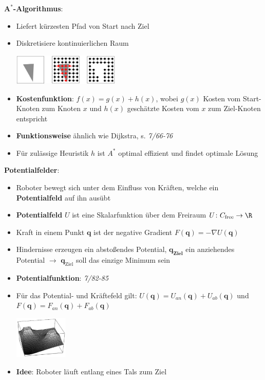 \bigskip
\textbf{$\mathbf{A^*}$-Algorithmus}:
\begin{itemize}
	\item Liefert kürzesten Pfad von Start nach Ziel
	\item Diskretisiere kontinuierlichen Raum
	\begin{center}
		\includegraphics[width=0.4\textwidth]{images/a-s.png}
	\end{center}
	\item \textbf{Kostenfunktion}: $f(x)=g(x)+h(x)$, wobei $g(x)$ Kosten vom Start-Knoten zum Knoten $x$ und $h(x)$ geschätzte Kosten vom $x$ zum Ziel-Knoten entspricht
	\item \textbf{Funktionsweise} ähnlich wie Dijkstra, s. \textit{7/66-76}
	\item Für zulässige Heuristik $h$ ist $A^*$ optimal effizient und findet optimale Lösung
\end{itemize}
\bigskip
\textbf{Potentialfelder}:
\begin{itemize}
	\item Roboter bewegt sich unter dem Einfluss von Kräften, welche ein \textbf{Potentialfeld} auf ihn ausübt
	\item \textbf{Potentialfeld} $U$ ist eine Skalarfunktion über dem Freiraum $U\colon C_\text{free}\rightarrow \R$
	\item Kraft in einem Punkt $\mathbf{q}$ ist der negative Gradient $F(\mathbf{q})=-\nabla U(\mathbf{q})$
	\item Hindernisse erzeugen ein abstoßendes Potential, $\mathbf{q_\text{Ziel}}$ ein anziehendes Potential $\rightarrow$ $\mathbf{q}_\text{Ziel}$ soll das einzige Minimum sein
	\item \textbf{Potentialfunktion}: \textit{7/82-85}
	\item Für das Potential- und Kräftefeld gilt: $U(\mathbf{q})=U_{an}(\mathbf{q})+U_{ab}(\mathbf{q})$ und $F(\mathbf{q})=F_{an}(\mathbf{q})+F_{ab}(\mathbf{q})$
	\begin{center}
		\includegraphics[width=0.2\textwidth]{images/potfeld.png}
	\end{center}
	\item \textbf{Idee}: Roboter läuft entlang eines Tals zum Ziel
\end{itemize}